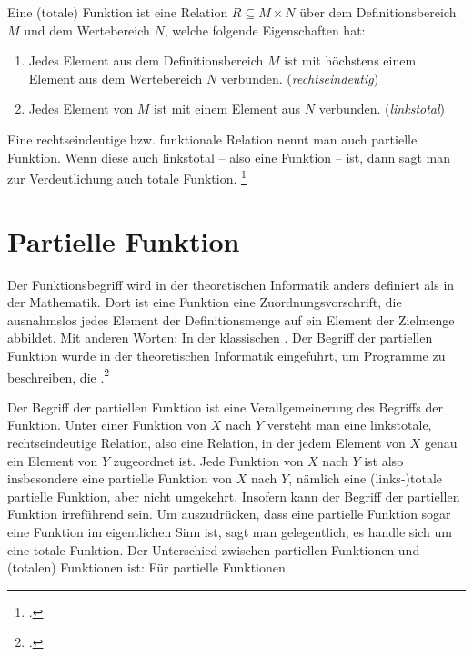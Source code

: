 \documentclass{lehramt-informatik-haupt}
\begin{document}
Eine (totale) Funktion ist eine Relation $R \subseteq M \times N$ über
dem Deﬁnitionsbereich $M$ und dem Wertebereich $N$, welche folgende
Eigenschaften hat:

\begin{enumerate}
\item Jedes Element aus dem Deﬁnitionsbereich $M$ ist mit höchstens
einem Element aus dem Wertebereich $N$ verbunden. (\emph{rechtseindeutig})

\item Jedes Element von $M$ ist mit einem Element aus $N$ verbunden.
(\emph{linkstotal})
\end{enumerate}

\begin{liExkurs}
Eine rechtseindeutige bzw. funktionale Relation nennt man auch partielle
Funktion. Wenn diese auch linkstotal – also eine Funktion – ist, dann
sagt man zur Verdeutlichung auch totale Funktion.
\footcite{wiki:relation}
\end{liExkurs}

\section{Partielle Funktion}

Der Funktionsbegriff wird in der theoretischen Informatik anders
definiert als in der Mathematik. Dort ist eine Funktion eine
Zuordnungsvorschrift, die ausnahmslos jedes Element der Definitionsmenge
auf ein Element der Zielmenge abbildet. Mit anderen Worten: In der
klassischen . Der Begriff
der partiellen Funktion wurde in der theoretischen Informatik
eingeführt, um Programme zu beschreiben, die .\footcite[Seite 51]{hoffmann}

Der Begriff der partiellen Funktion ist eine Verallgemeinerung des
Begriffs der Funktion. Unter einer Funktion von $X$ nach $Y$ versteht
man eine linkstotale, rechtseindeutige Relation, also eine Relation, in
der jedem Element von $X$ genau ein Element von $Y$ zugeordnet ist. Jede
Funktion von $X$ nach $Y$ ist also insbesondere eine partielle Funktion
von $X$ nach $Y$, nämlich eine (links-)totale partielle Funktion, aber
nicht umgekehrt. Insofern kann der Begriff der partiellen Funktion
irreführend sein. Um auszudrücken, dass eine partielle Funktion sogar
eine Funktion im eigentlichen Sinn ist, sagt man gelegentlich, es handle
sich um eine totale Funktion. Der Unterschied zwischen partiellen
Funktionen und (totalen) Funktionen ist: Für partielle Funktionen
\end{document}
